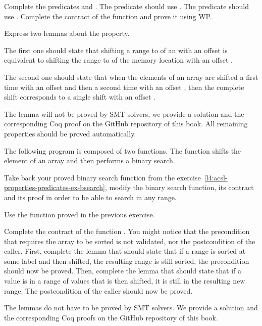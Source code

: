 

Complete the predicates  and .
The  predicate should use .
The  predicate should use .
Complete the contract of the  function and prove
it using WP.


Express two lemmas about the  property.


The first one  should state that shifting a range
 to  of an  with an
offset  is equivalent to shifting the range  to
 of the memory location  with an offset
.



The second one should state that when the elements of an array are shifted a
first time with an offset  and then a second time with an offset
, then the complete shift corresponds to a single shift with an
offset .



The lemma  will not be proved by SMT solvers, we provide
a solution and the corresponding Coq proof on the GitHub repository of this
book. All remaining properties should be proved automatically.





The following program is composed of two functions. The function
 shifts the element of an array and then
performs a binary search.




Take back your proved binary search function from the
exercise~\ref{l4:acsl-properties-predicates-ex-bsearch}, modify the binary
search function, its contract and its proof in order to be able to search in
any range.


Use the  function proved in the previous exercise.


Complete the contract of the function . You might
notice that the precondition that requires the array to be sorted is not
validated, nor the postcondition of the caller. First, complete the lemma
 that should state that if a range is sorted
at some label and then shifted, the resulting range is still sorted, the
precondition should now be proved. Then, complete the lemma
 that should state that if a value is in a range
of values that is then shifted, it is still in the resulting new range. The
postcondition of the caller should now be proved.


The lemmas do not have to be proved by SMT solvers. We provide a solution and
the corresponding Coq proofs on the GitHub repository of this book.
